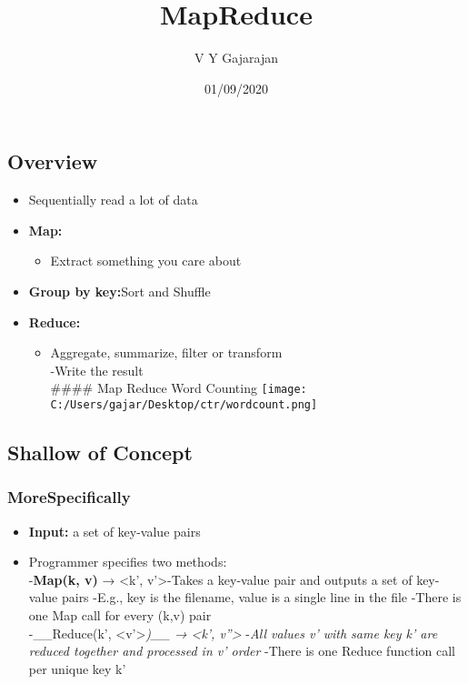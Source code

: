 \documentclass[
]{article}
\title{MapReduce}
\author{V Y Gajarajan}
\date{01/09/2020}
\providecommand{\tightlist}{%
  \setlength{\itemsep}{0pt}\setlength{\parskip}{0pt}}
\begin{document}
\maketitle

\hypertarget{overview}{%
\subsection{Overview}\label{overview}}

\begin{itemize}
\tightlist
\item
  Sequentially read a lot of data
\item
  \textbf{Map:}

  \begin{itemize}
  \tightlist
  \item
    Extract something you care about
  \end{itemize}
\item
  \textbf{Group by key:}Sort and Shuffle
\item
  \textbf{Reduce:}

  \begin{itemize}
  \tightlist
  \item
    Aggregate, summarize, filter or transform\\
    -Write the result\\
    \#\#\#\# Map Reduce Word Counting
    \texttt{[image: C:/Users/gajar/Desktop/ctr/wordcount.png]}
  \end{itemize}
\end{itemize}

\hypertarget{shallow-of-concept}{%
\subsection{Shallow of Concept}\label{shallow-of-concept}}

\hypertarget{morespecifically}{%
\subsubsection{MoreSpecifically}\label{morespecifically}}

\begin{itemize}
\tightlist
\item
  \textbf{Input:} a set of key-value pairs
\item
  Programmer specifies two methods:\\
  -\textbf{Map(k, v)} → \textless k', v'\textgreater* -Takes a key-value
  pair and outputs a set of key-value pairs -E.g., key is the filename,
  value is a single line in the file -There is one Map call for every
  (k,v) pair\\
  -\_\_Reduce(k', \textless v'\textgreater{}\emph{)\_\_ → \textless k',
  v''\textgreater{}} -\emph{All values v' with same key k' are reduced
  together and processed in v' order} -There is one Reduce function call
  per unique key k'
\end{itemize}
\end{document}
